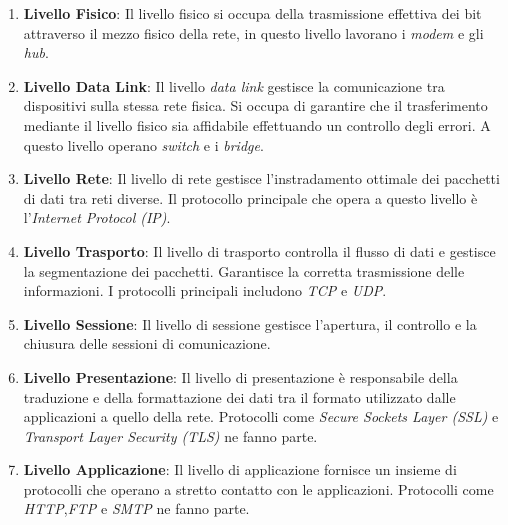 \begin{enumerate}
    \item \textbf{Livello Fisico}: Il livello fisico si occupa della trasmissione effettiva dei bit attraverso il mezzo fisico della rete, in questo livello lavorano i \emph{modem} e gli \emph{hub}. 
    \item \textbf{Livello Data Link}: Il livello \emph{data link} gestisce la comunicazione tra dispositivi sulla stessa rete fisica. Si occupa di garantire che il trasferimento mediante il livello fisico sia affidabile effettuando un controllo degli errori. A questo livello operano \emph{switch} e i \emph{bridge}.
    \item \textbf{Livello Rete}: Il livello di rete gestisce l'instradamento ottimale dei pacchetti di dati tra reti diverse. Il protocollo principale che opera a questo livello è l'\emph{Internet Protocol (IP)}. 
    \item \textbf{Livello Trasporto}: Il livello di trasporto controlla il flusso di dati e gestisce la segmentazione dei pacchetti. Garantisce la corretta trasmissione delle informazioni. I protocolli principali includono \emph{TCP} e \emph{UDP}.
    \item \textbf{Livello Sessione}: Il livello di sessione gestisce l'apertura, il controllo e la chiusura delle sessioni di comunicazione. 
    \item \textbf{Livello Presentazione}: Il livello di presentazione è responsabile della traduzione e della formattazione dei dati tra il formato utilizzato dalle applicazioni a quello della rete. Protocolli come \emph{Secure Sockets Layer (SSL)} e \emph{Transport Layer Security (TLS)} ne fanno parte.
    \item \textbf{Livello Applicazione}: Il livello di applicazione fornisce un insieme di protocolli che operano a stretto contatto con le applicazioni. Protocolli come \emph{HTTP},\emph{FTP} e \emph{SMTP} ne fanno parte.

\end{enumerate}


